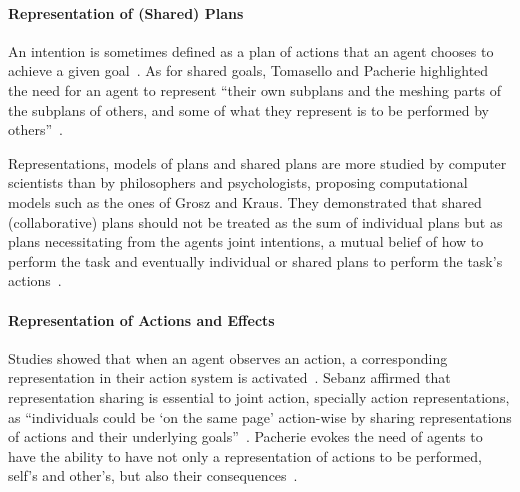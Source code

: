 \documentclass[a4paper,11pt,twoside]{StyleThese}
\begin{document}
\paragraph{Representation of (Shared) Plans}
An intention is sometimes defined as a plan of actions that an agent chooses to achieve a given goal~\cite{tomasello_2005_understanding, kaplan_2006_challenges}. 
As for shared goals, Tomasello \etal{} and Pacherie highlighted the need for an agent to represent ``their own subplans and the meshing parts of the subplans of others, and some of what they represent is to be performed by others''~\cite[p.~353]{pacherie_2012_agency}.

Representations, models of plans and shared plans are more studied by computer scientists than by philosophers and psychologists, proposing computational models such as the ones of Grosz and Kraus. They demonstrated that shared (collaborative) plans should not be treated as the sum of individual plans but as plans necessitating from the agents joint intentions, a mutual belief of how to perform the task and eventually individual or shared plans to perform the task's actions~\cite{grosz_1996_collaborative}.

\paragraph{Representation of Actions and Effects}
Studies showed that when an agent observes an action, a corresponding representation in their action system is activated~\cite{rizzolatti_2004_mirror}. Sebanz \etal{} affirmed that representation sharing is essential to joint action, specially action representations, as ``individuals could be ‘on the same page’ action-wise by sharing representations of actions and their underlying goals''~\cite[p.~71]{sebanz_2006_joint}. Pacherie evokes the need of agents to have the ability to have not only a representation of actions to be performed, self's and other's, but also their consequences~\cite{pacherie_2012_agency}. 
\end{document}
